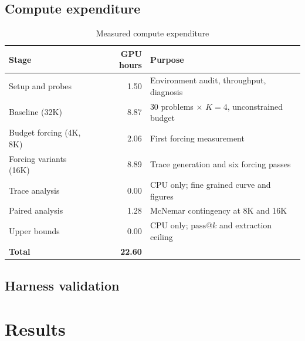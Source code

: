 \documentclass[12pt,a4paper,oneside]{report}
\newif\ifdraft
\newcommand{\writehere}[2]{%
  \ifdraft
    \begin{tcolorbox}[colback=yellow!8,colframe=orange!55,
                      boxrule=0.6pt,left=6pt,right=6pt,top=4pt,bottom=4pt]
    {\small\textbf{WRITE: #1}\\[2pt]#2}
    \end{tcolorbox}
  \fi}
\begin{document}
\section{Compute expenditure}

\begin{table}[htbp]
\centering
\caption{Measured compute expenditure}
\label{tab:compute}
\small
\begin{tabular}{@{}lrl@{}}
\toprule
\textbf{Stage} & \textbf{GPU hours} & \textbf{Purpose} \\
\midrule
Setup and probes & 1.50 & Environment audit, throughput, diagnosis \\
Baseline (32K) & 8.87 & 30 problems $\times$ $K{=}4$, unconstrained budget \\
Budget forcing (4K, 8K) & 2.06 & First forcing measurement \\
Forcing variants (16K) & 8.89 & Trace generation and six forcing passes \\
Trace analysis & 0.00 & CPU only; fine grained curve and figures \\
Paired analysis & 1.28 & McNemar contingency at 8K and 16K \\
Upper bounds & 0.00 & CPU only; $\text{pass}@k$ and extraction ceiling \\
\midrule
\textbf{Total} & \textbf{22.60} & \\
\bottomrule
\end{tabular}
\end{table}

\section{Harness validation}

\writehere{2 paragraphs}{
First check: your baseline reproduction gave 80.8 against the published 91.4. Make
the point that the direction matters. Your figure is lower, which argues against
contamination inflating anything.
\\[4pt]
Second check: the prefix consistency identity of Equation \eqref{eq:prefix} tested
directly. An 8,192 token condition measured two ways, a genuine 8k run and
truncated 16k traces, gave 54.2 and 55.8 percent. Two samples out of 120, within
noise at temperature 1.0. Say every later budget result depends on this identity
holding.}

\chapter{Results}
\end{document}
